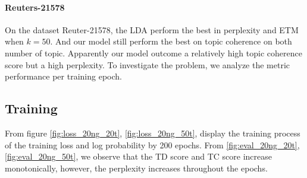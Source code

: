 \paragraph{Reuters-21578}
On the dataset Reuter-21578, the LDA perform the best in perplexity and ETM when $ k=50 $. And our model still perform the best on topic coherence on both number of topic. 
%
Apparently our model outcome a relatively high topic coherence score but a high perplexity. To investigate the problem, we analyze the metric performance per training epoch.

\subsection{Training}
From figure \ref{fig:loss_20ng_20t}, \ref{fig:loss_20ng_50t}, display the training process of the training loss and log probability by 200 epochs. From \ref{fig:eval_20ng_20t}, \ref{fig:eval_20ng_50t}, we observe that the TD score and TC score increase monotonically, however, the perplexity increases throughout the epochs. 
